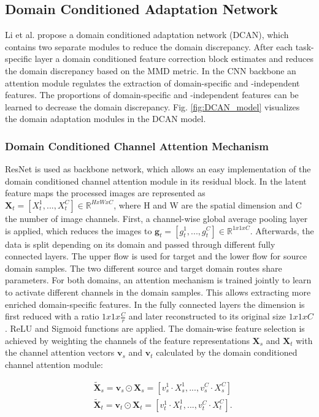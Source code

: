 \subsection{Domain Conditioned Adaptation Network}
Li et al. \cite{li2020} propose a domain conditioned adaptation network (DCAN), which contains two separate modules to reduce the domain discrepancy. After each task-specific layer a domain conditioned feature correction block estimates and reduces the domain discrepancy based on the MMD metric. In the CNN backbone an attention module regulates the extraction of domain-specific and -independent features. The proportions of domain-specific and -independent features can be learned to decrease the domain discrepancy. Fig. \ref{fig:DCAN_model} visualizes the domain adaptation modules in the DCAN model.

\subsubsection{Domain Conditioned Channel Attention Mechanism}
ResNet is used as backbone network, which allows an easy implementation of the domain conditioned channel attention module in its residual block. In the latent feature maps the processed images are represented as $\pmb{X}_{t} = [X^{1}_{t},...,X^{C}_{t}] \in \mathbb{R}^{HxWxC}$, where H and W are the spatial dimension and C the number of image channels. First, a channel-wise global average pooling layer is applied, which reduces the images to  $\pmb{g}_{t} = [g^{1}_{t},...,g^{C}_{t}] \in \mathbb{R}^{1x1xC}$. Afterwards, the data is split depending on its domain and passed through different fully connected layers. The upper flow is used for target and the lower flow for source domain samples. The two different source and target domain routes share parameters. For both domains, an attention mechanism is trained jointly to learn to activate different channels in the domain samples. This allows extracting more enriched domain-specific features. In the fully connected layers the dimension is first reduced with a ratio ${1x1x\frac{C}{r}}$ and later reconstructed to its original size ${1x1xC}$. ReLU and Sigmoid functions are applied. The domain-wise feature selection is achieved by weighting the channels of the feature representations $\pmb{X}_{s}$ and $\pmb{X}_{t}$ with the channel attention vectors $\pmb{v}_{s}$ and $\pmb{v}_{t}$ calculated by the domain conditioned channel attention module:

\begin{equation}
    \begin{aligned}
        &\pmb{\tilde{X}}_{s} = \pmb{v}_{s} \odot \pmb{X}_{s} = [v_{s}^{1} \cdot X_{s}^{1}, ..., v_{s}^{C} \cdot X_{s}^{C}]\\
        &\pmb{\tilde{X}}_{t} = \pmb{v}_{t} \odot \pmb{X}_{t} = [v_{t}^{1} \cdot X_{t}^{1}, ..., v_{t}^{C} \cdot X_{t}^{C}].
    \end{aligned}
\end{equation}

